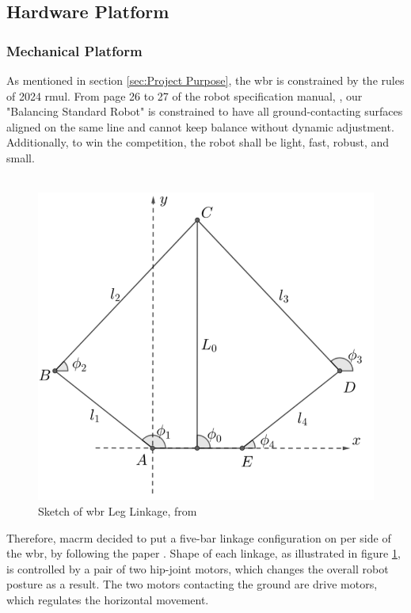 \documentclass[12pt]{article}
\begin{document}
\subsection{Hardware Platform}
    \subsubsection{Mechanical Platform}
    As mentioned in section \ref{sec:Project Purpose}, the \acrshort{wbr} is constrained by the rules of 2024 \acrshort{rmul}. From page 26 to 27 of the robot specification manual, \citet{RmuBuildSpecs2024}, our "Balancing Standard Robot" is constrained to have all ground-contacting surfaces aligned on the same line and cannot keep balance without dynamic adjustment. Additionally, to win the competition, the robot shall be light, fast, robust, and small.\\\\
    \begin{figure}[H]
        \centering
        \includegraphics[scale=0.5]{../Leg Linkage.png}
        \caption{Sketch of \acrshort{wbr} Leg Linkage, from \citet{HarbinEngCtrlDesign2022}}
        \label{fig:Leg Linkage}
    \end{figure}
    Therefore, \acrshort{macrm} decided to put a five-bar linkage configuration on per side of the \acrshort{wbr}, by following the paper \citet{WbrBalanceControl2021}. Shape of each linkage, as illustrated in figure \ref{fig:Leg Linkage}, is controlled by a pair of two hip-joint motors, which changes the overall robot posture as a result. The two motors contacting the ground are drive motors, which regulates the horizontal movement.
    
\end{document}
